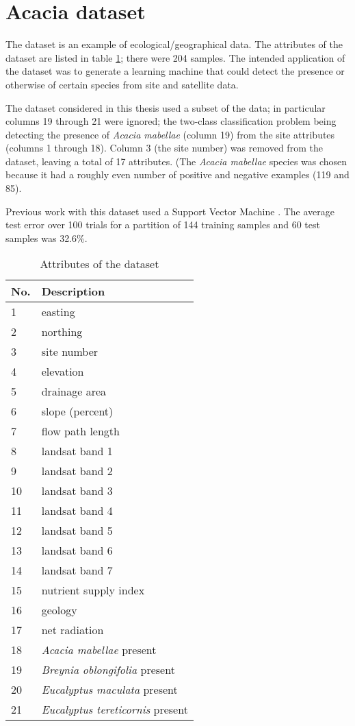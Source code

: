 \section{Acacia dataset}

The  dataset is an example of ecological/geographical
data.  The attributes of the dataset are listed in table
\ref{tbl:acacia attributes}; there were 204 samples.  The intended
application of the dataset was to generate a learning machine that
could detect the presence or otherwise of certain species from site
and satellite data.

The  dataset considered in this thesis used a subset of the
data; in particular columns 19 through 21 were ignored; the two-class
classification problem being detecting the presence of {\it Acacia
mabellae} (column 19) from the site attributes (columns 1 through
18).  Column 3 (the site number) was removed from the dataset, leaving
a total of 17 attributes.  (The {\it Acacia mabellae} species was
chosen because it had a roughly even number of positive and negative
examples (119 and 85).

Previous work with this dataset \cite{Payne97, Williamson97a} used a
Support Vector Machine \cite{Vapnik95}.  The average test error over
100 trials for a partition of 144 training samples and 60 test samples
was 32.6\%.

\begin{table}
\begin{center}
\begin{tabular}{l l}
\hline
\bf{No.} & \bf{Description} \\
\hline\hline
1&	easting \\
2&	northing \\
3&	site number \\
4&	elevation  \\
5&	drainage area \\
6&	slope (percent)\\
7&	flow path length\\
8&	landsat band 1 \\
9&	landsat band 2\\
10&	landsat band 3\\
11&	landsat band 4 \\
12&	landsat band 5\\
13&	landsat band 6 \\
14&	landsat band 7 \\
15&	nutrient supply index\\
16&	geology\\
17&	net radiation\\
\hline
18&	{\it Acacia mabellae} present\\
19&	{\it Breynia oblongifolia} present\\
20&	{\it Eucalyptus maculata} present\\
21&	{\it Eucalyptus tereticornis} present\\
\hline
\end{tabular}
\end{center}
\caption{Attributes of the  dataset}
\label{tbl:acacia attributes}
\end{table}

